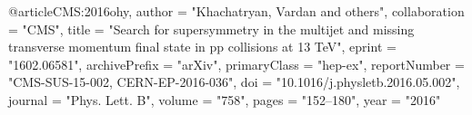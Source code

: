 @article{CMS:2016ohy,
    author = "Khachatryan, Vardan and others",
    collaboration = "CMS",
    title = "{Search for supersymmetry in the multijet and missing transverse momentum final state in pp collisions at 13 TeV}",
    eprint = "1602.06581",
    archivePrefix = "arXiv",
    primaryClass = "hep-ex",
    reportNumber = "CMS-SUS-15-002, CERN-EP-2016-036",
    doi = "10.1016/j.physletb.2016.05.002",
    journal = "Phys. Lett. B",
    volume = "758",
    pages = "152--180",
    year = "2016"
}

